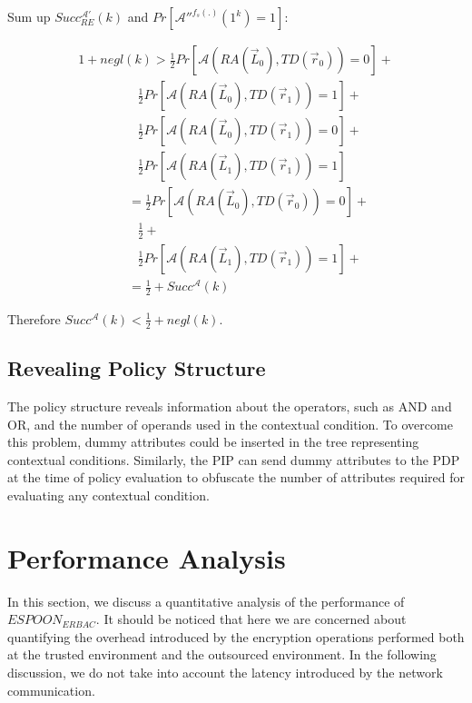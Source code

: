 \documentclass[final,5p,times,twocolumn]{elsarticle}
\begin{document}
Sum up $Succ_{RE}^{\mathcal{A}'}(k)$ and $Pr[\mathcal{A}''^{f_{s}(.)}(1^k)=1]$:

\begin{equation}
\begin{array}{l}
1+negl(k) >  \frac{1}{2}Pr[\mathcal{A}(RA(\vec{L}_0),TD(\vec{r}_0))=0]+\\
\hspace{56pt}\frac{1}{2}Pr[\mathcal{A}(RA(\vec{L}_0),TD(\vec{r}_1))=1]+\\
\hspace{56pt}\frac{1}{2}Pr[\mathcal{A}(RA(\vec{L}_0),TD(\vec{r}_1))=0]+ \\
\hspace{56pt}\frac{1}{2}Pr[\mathcal{A}(RA(\vec{L}_1),TD(\vec{r}_1))=1] \\
\hspace{47pt}=\frac{1}{2}Pr[\mathcal{A}(RA(\vec{L}_0),TD(\vec{r}_0))=0]+\\
\hspace{56pt}\frac{1}{2}+\\
\hspace{56pt}\frac{1}{2}Pr[\mathcal{A}(RA(\vec{L}_1),TD(\vec{r}_1))=1]+ \\
\hspace{47pt}= \frac{1}{2} + Succ^{\mathcal{A}}(k)
\end{array}
\end{equation}

Therefore $Succ^{\mathcal{A}}(k)< \frac{1}{2} + negl(k)$. 



\subsection{Revealing Policy Structure}
The policy structure reveals information about the operators, such as AND and OR, and the number of operands used in the contextual condition. To overcome this problem, dummy attributes could be inserted in the tree representing contextual conditions. Similarly, the PIP can send dummy attributes to the PDP at the time of policy evaluation to obfuscate the number of attributes required for evaluating any contextual condition.

\section{Performance Analysis}
\label{sec:performance-analysis}

In this section, we discuss a quantitative analysis of the performance of $\mathit{ESPOON_{ERBAC}}$. It should be noticed that here we are concerned about quantifying the overhead introduced by the encryption operations performed both at the trusted environment and the outsourced environment. In the following discussion, we do not take into account the latency introduced by the network communication.
\end{document}
